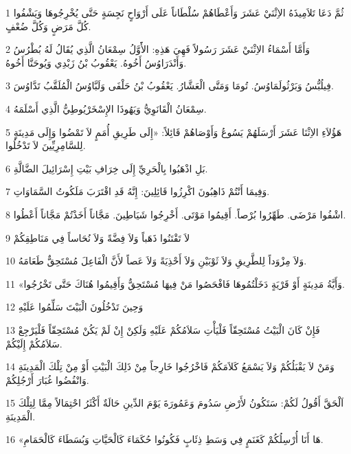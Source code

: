 \par 1 ثُمَّ دَعَا تَلاَمِيذَهُ الاِثْنَيْ عَشَرَ وَأَعْطَاهُمْ سُلْطَاناً عَلَى أَرْوَاحٍ نَجِسَةٍ حَتَّى يُخْرِجُوهَا وَيَشْفُوا كُلَّ مَرَضٍ وَكُلَّ ضُعْفٍ.
\par 2 وَأَمَّا أَسْمَاءُ الاِثْنَيْ عَشَرَ رَسُولاً فَهِيَ هَذِهِ: الأَََوَّلُ سِمْعَانُ الَّذِي يُقَالُ لَهُ بُطْرُسُ وَأَنْدَرَاوُسُ أَخُوهُ. يَعْقُوبُ بْنُ زَبْدِي وَيُوحَنَّا أَخُوهُ.
\par 3 فِيلُبُّسُ وَبَرْثُولَمَاوُسُ. تُومَا وَمَتَّى الْعَشَّارُ. يَعْقُوبُ بْنُ حَلْفَى وَلَبَّاوُسُ الْمُلَقَّبُ تَدَّاوُسَ.
\par 4 سِمْعَانُ الْقَانَوِيُّ وَيَهُوذَا الإِسْخَرْيُوطِيُّ الَّذِي أَسْلَمَهُ.
\par 5 هَؤُلاَءِ الاِثْنَا عَشَرَ أَرْسَلَهُمْ يَسُوعُ وَأَوْصَاهُمْ قَائِلاً: «إِلَى طَرِيقِ أُمَمٍ لاَ تَمْضُوا وَإِلَى مَدِينَةٍ لِلسَّامِرِيِّينَ لاَ تَدْخُلُوا.
\par 6 بَلِ اذْهَبُوا بِالْحَرِيِّ إِلَى خِرَافِ بَيْتِ إِسْرَائِيلَ الضَّالَّةِ.
\par 7 وَفِيمَا أَنْتُمْ ذَاهِبُونَ اكْرِزُوا قَائِلِينَ: إِنَّهُ قَدِ اقْتَرَبَ مَلَكُوتُ السَّمَاوَاتِ.
\par 8 اشْفُوا مَرْضَى. طَهِّرُوا بُرْصاً. أَقِيمُوا مَوْتَى. أَخْرِجُوا شَيَاطِينَ. مَجَّاناً أَخَذْتُمْ مَجَّاناً أَعْطُوا.
\par 9 لاَ تَقْتَنُوا ذَهَباً وَلاَ فِضَّةً وَلاَ نُحَاساً فِي مَنَاطِقِكُمْ
\par 10 وَلاَ مِزْوَداً لِلطَّرِيقِ وَلاَ ثَوْبَيْنِ وَلاَ أَحْذِيَةً وَلاَ عَصاً لأَنَّ الْفَاعِلَ مُسْتَحِقٌّ طَعَامَهُ.
\par 11 «وَأَيَّةُ مَدِينَةٍ أَوْ قَرْيَةٍ دَخَلْتُمُوهَا فَافْحَصُوا مَنْ فِيهَا مُسْتَحِقٌّ وَأَقِيمُوا هُنَاكَ حَتَّى تَخْرُجُوا.
\par 12 وَحِينَ تَدْخُلُونَ الْبَيْتَ سَلِّمُوا عَلَيْهِ
\par 13 فَإِنْ كَانَ الْبَيْتُ مُسْتَحِقّاً فَلْيَأْتِ سَلاَمُكُمْ عَلَيْهِ وَلَكِنْ إِنْ لَمْ يَكُنْ مُسْتَحِقّاً فَلْيَرْجِعْ سَلاَمُكُمْ إِلَيْكُمْ.
\par 14 وَمَنْ لاَ يَقْبَلُكُمْ وَلاَ يَسْمَعُ كَلاَمَكُمْ فَاخْرُجُوا خَارِجاً مِنْ ذَلِكَ الْبَيْتِ أَوْ مِنْ تِلْكَ الْمَدِينَةِ وَانْفُضُوا غُبَارَ أَرْجُلِكُمْ.
\par 15 اَلْحَقَّ أَقُولُ لَكُمْ: سَتَكُونُ لأَرْضِ سَدُومَ وَعَمُورَةَ يَوْمَ الدِّينِ حَالَةٌ أَكْثَرُ احْتِمَالاً مِمَّا لِتِلْكَ الْمَدِينَةِ.
\par 16 «هَا أَنَا أُرْسِلُكُمْ كَغَنَمٍ فِي وَسَطِ ذِئَابٍ فَكُونُوا حُكَمَاءَ كَالْحَيَّاتِ وَبُسَطَاءَ كَالْحَمَامِ.
